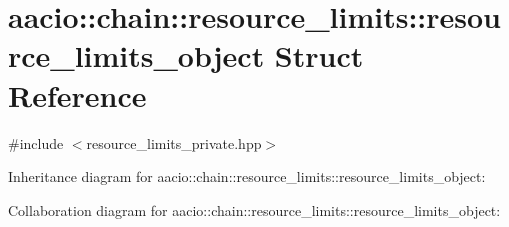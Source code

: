 \hypertarget{structaacio_1_1chain_1_1resource__limits_1_1resource__limits__object}{}\section{aacio\+:\+:chain\+:\+:resource\+\_\+limits\+:\+:resource\+\_\+limits\+\_\+object Struct Reference}
\label{structaacio_1_1chain_1_1resource__limits_1_1resource__limits__object}


{\ttfamily \#include $<$resource\+\_\+limits\+\_\+private.\+hpp$>$}



Inheritance diagram for aacio\+:\+:chain\+:\+:resource\+\_\+limits\+:\+:resource\+\_\+limits\+\_\+object\+:


Collaboration diagram for aacio\+:\+:chain\+:\+:resource\+\_\+limits\+:\+:resource\+\_\+limits\+\_\+object\+:
